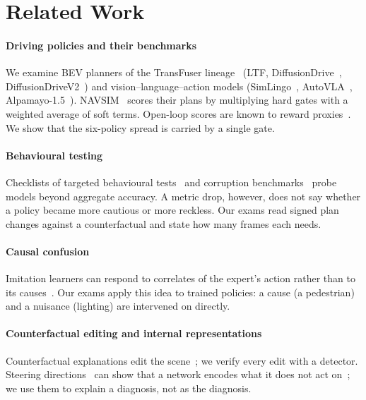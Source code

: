\section{Related Work}
\label{sec:related}

\paragraph{Driving policies and their benchmarks}
We examine BEV planners of the TransFuser lineage~\cite{chitta2023transfuser} (LTF,
DiffusionDrive~\cite{liao2025diffusiondrive}, DiffusionDriveV2~\cite{diffusiondrivev2}) and
vision--language--action models (SimLingo~\cite{renz2025simlingo}, AutoVLA~\cite{zhou2025autovla},
Alpamayo-1.5~\cite{nvidia2025alpamayo,nvidia2026alpamayo15}). NAVSIM~\cite{dauner2024navsim,cao2025pseudosim} scores their
plans by multiplying hard gates with a weighted average of soft terms. Open-loop scores are known to
reward proxies~\cite{li2024egostatus}. We show that the six-policy spread is carried by a single gate.

\paragraph{Behavioural testing}
Checklists of targeted behavioural tests~\cite{ribeiro2020checklist} and corruption
benchmarks~\cite{hendrycks2019benchmarking,kong2023robo3d,xie2023robobev} probe models beyond aggregate
accuracy. A metric drop, however, does not say whether a policy became more cautious or more reckless.
Our exams read signed plan changes against a counterfactual and state how many frames each needs.

\paragraph{Causal confusion}
Imitation learners can respond to correlates of the expert's action rather than to its
causes~\cite{dehaan2019causal,wen2020copycat,codevilla2019exploring,geirhos2020shortcut}. Our exams
apply this idea to trained policies: a cause (a pedestrian) and a nuisance (lighting) are intervened
on directly.

\paragraph{Counterfactual editing and internal representations}
Counterfactual explanations edit the scene~\cite{jacob2022steex,zemni2023octet}; we verify every edit
with a detector. Steering directions~\cite{zou2023repe} can show that a network encodes what it does not
act on~\cite{azaria2023internal}; we use them to explain a diagnosis, not as the diagnosis.
